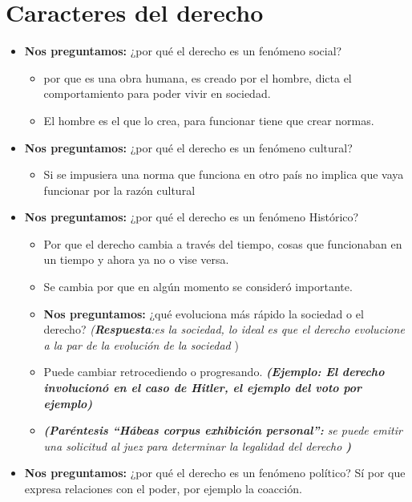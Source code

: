\section{Caracteres del derecho}
\begin{itemize}
    \item \textbf{Nos preguntamos:} ¿por qué el derecho es un fenómeno social?
    \begin{itemize}
        \item por que es una obra humana,  es creado por el hombre, dicta el comportamiento para poder vivir en sociedad.
        \item El hombre es el que lo crea, para funcionar tiene que crear normas.
    \end{itemize}
    
    \item \textbf{Nos preguntamos:} ¿por qué el derecho es un fenómeno cultural?
    \begin{itemize}
        \item Si se impusiera una norma que funciona en otro país no implica que vaya funcionar por la razón cultural
    \end{itemize}

    \item \textbf{Nos preguntamos:} ¿por qué el derecho es un fenómeno Histórico?
    \begin{itemize}
        \item Por que el derecho cambia a través del tiempo, cosas que funcionaban en un tiempo y ahora ya no o vise versa.
        \item Se cambia por que en algún momento se consideró importante.
        \item \textbf{Nos preguntamos:} ¿qué evoluciona más rápido la sociedad o el derecho? \emph{(\textbf{Respuesta}:es la sociedad, lo ideal es que el derecho evolucione a la par de la evolución de la sociedad })
        \item Puede cambiar retrocediendo o progresando. \textbf{\emph{(Ejemplo: El derecho involucionó en el caso de Hitler, el ejemplo del voto por ejemplo)}}
        \item \emph{\textbf{(Paréntesis ``Hábeas corpus exhibición personal'':} se puede emitir una solicitud al juez para determinar la legalidad del derecho \textbf{)}}
    \end{itemize}

    \item \textbf{Nos preguntamos:} ¿por qué el derecho es un fenómeno político? Sí por que expresa relaciones con el poder, por ejemplo la coacción.
    
\end{itemize}

